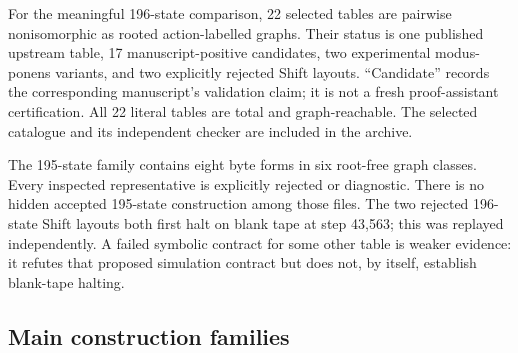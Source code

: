\documentclass[11pt,a4paper]{article}
\begin{document}
For the meaningful 196-state comparison, 22 selected tables are pairwise
nonisomorphic as rooted action-labelled graphs. Their status is one
published upstream table, 17 manuscript-positive candidates, two
experimental modus-ponens variants, and two explicitly rejected Shift
layouts. ``Candidate'' records the corresponding manuscript's validation
claim; it is not a fresh proof-assistant certification. All 22 literal
tables are total and graph-reachable. The selected catalogue and its
independent checker are included in the archive.

The 195-state family contains eight byte forms in six root-free graph
classes. Every inspected representative is explicitly rejected or
diagnostic. There is no hidden accepted 195-state construction among those
files. The two rejected 196-state Shift layouts both first halt on blank
tape at step 43,563; this was replayed independently. A failed symbolic
contract for some other table is weaker evidence: it refutes that proposed
simulation contract but does not, by itself, establish blank-tape halting.

\subsection{Main construction families}
\end{document}
